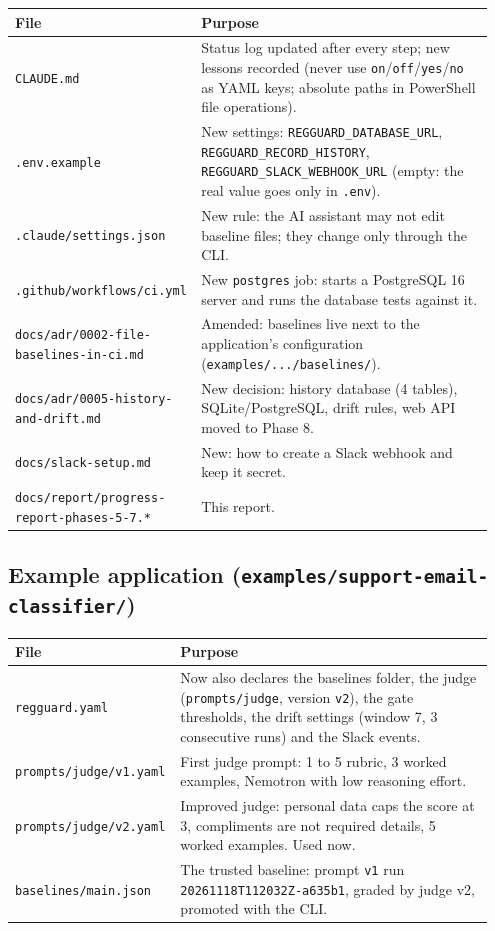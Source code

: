 \documentclass[11pt,a4paper]{article}
\newcommand{\code}[1]{\nolinkurl{#1}}
\begin{document}
\begin{longtable}{@{}p{0.34\linewidth}p{0.61\linewidth}@{}}
\toprule
\textbf{File} & \textbf{Purpose} \\
\midrule
\endhead
\code{CLAUDE.md} & Status log updated after every step; new lessons recorded (never use \code{on}/\code{off}/\code{yes}/\code{no} as YAML keys; absolute paths in PowerShell file operations). \\
\code{.env.example} & New settings: \code{REGGUARD_DATABASE_URL}, \code{REGGUARD_RECORD_HISTORY}, \code{REGGUARD_SLACK_WEBHOOK_URL} (empty: the real value goes only in \code{.env}). \\
\code{.claude/settings.json} & New rule: the AI assistant may not edit baseline files; they change only through the CLI. \\
\code{.github/workflows/ci.yml} & New \code{postgres} job: starts a PostgreSQL 16 server and runs the database tests against it. \\
\code{docs/adr/0002-file-baselines-in-ci.md} & Amended: baselines live next to the application's configuration (\code{examples/.../baselines/}). \\
\code{docs/adr/0005-history-and-drift.md} & New decision: history database (4 tables), SQLite/PostgreSQL, drift rules, web API moved to Phase 8. \\
\code{docs/slack-setup.md} & New: how to create a Slack webhook and keep it secret. \\
\code{docs/report/progress-report-phases-5-7.*} & This report. \\
\bottomrule
\end{longtable}

\subsection{Example application (\texorpdfstring{\code{examples/support-email-classifier/}}{examples/support-email-classifier/})}

\begin{longtable}{@{}p{0.30\linewidth}p{0.65\linewidth}@{}}
\toprule
\textbf{File} & \textbf{Purpose} \\
\midrule
\endhead
\code{regguard.yaml} & Now also declares the baselines folder, the judge (\code{prompts/judge}, version \code{v2}), the gate thresholds, the drift settings (window 7, 3 consecutive runs) and the Slack events. \\
\code{prompts/judge/v1.yaml} & First judge prompt: 1 to 5 rubric, 3 worked examples, Nemotron with low reasoning effort. \\
\code{prompts/judge/v2.yaml} & Improved judge: personal data caps the score at 3, compliments are not required details, 5 worked examples. Used now. \\
\code{baselines/main.json} & The trusted baseline: prompt \code{v1} run \code{20261118T112032Z-a635b1}, graded by judge v2, promoted with the CLI. \\
\bottomrule
\end{longtable}
\end{document}

